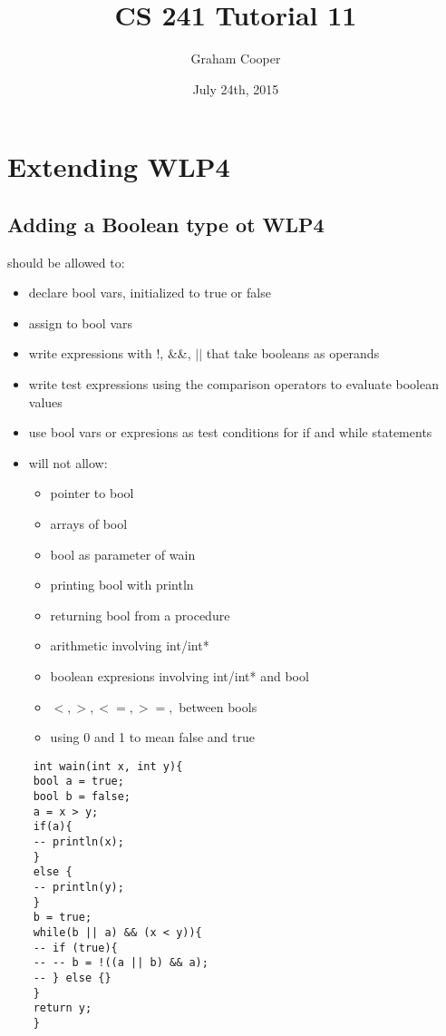 \documentclass[12pt]{article}
\title{\vspace{-15ex}CS 241 Tutorial 11\vspace{-1ex}}
\date{July 24th, 2015}
\author{Graham Cooper}
\begin{document}
	\maketitle
	
	\section*{Extending WLP4}
	
	\subsection*{Adding a Boolean type ot WLP4}
	should be allowed to:
	\begin{itemize}
		\item declare bool vars, initialized to true or false
		\item assign to bool vars
		\item write expressions with !, \&\&, $||$ that take booleans as operands
		\item write test expressions using the comparison operators to evaluate boolean values
		\item use bool vars or expresions as test conditions for if and while statements
		\item will not allow:
		\begin{itemize}
			\item pointer to bool
			\item arrays of bool
			\item bool as parameter of wain
			\item printing bool with println
			\item returning bool from a procedure
			\item arithmetic involving int/int*
			\item boolean expresions involving int/int* and bool
			\item $<,>,<=, >=,$ between bools
			\item using 0 and 1 to mean false and true
		\end{itemize}
	\end{itemize}
	
	\begin{verbatim}
	int wain(int x, int y){
	bool a = true;
	bool b = false;
	a = x > y;
	if(a){
	-- println(x);
	}
	else {
	-- println(y);
	}
	b = true;
	while(b || a) && (x < y)){
	-- if (true){
	-- -- b = !((a || b) && a);
	-- } else {}
	}
	return y;
	}
	\end{verbatim}
	
\end{document}
